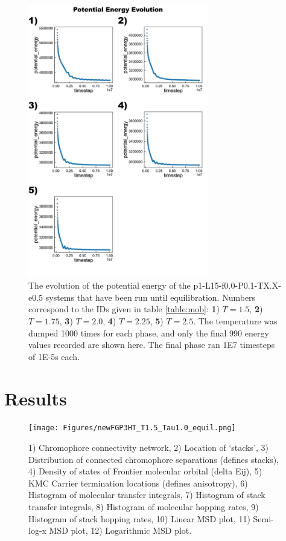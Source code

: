 \documentclass[12pt]{article}
\begin{document}
\begin{figure}[h!]\centering
	\includegraphics[width=0.7\textwidth]{Figures/Potential_Energy_Evolution.png}
    \caption{The evolution of the potential energy of the p1-L15-f0.0-P0.1-TX.X-e0.5 systems that have been run until equilibration.
        Numbers correspond to the IDs given in table \ref{table:mob}: \textbf{1}) $T = 1.5$, \textbf{2}) $T = 1.75$, \textbf{3}) $T = 2.0$, \textbf{4}) $T = 2.25$, \textbf{5}) $T = 2.5$.
    The temperature was dumped 1000 times for each phase, and only the final 990 energy values recorded are shown here.
    The final phase ran 1E7 timesteps of 1E-5s each.
}
	\label{fig:PE}
\end{figure}


\clearpage


\section{Results}


\begin{figure}[h]\centering
	\texttt{[image: Figures/newFGP3HT\_T1.5\_Tau1.0\_equil.png]}
    \caption{   1) Chromophore connectivity network, 
                2) Location of `stacks', 
                3) Distribution of connected chromophore separations (defines stacks),
                4) Density of states of Frontier molecular orbital (delta Eij),
                5) KMC Carrier termination locations (defines anisotropy),
                6) Histogram of molecular transfer integrals,
                7) Histogram of stack transfer integrals,
                8) Histogram of molecular hopping rates,
                9) Histogram of stack hopping rates,
                10) Linear MSD plot,
                11) Semi-log-x MSD plot,
                12) Logarithmic MSD plot.}
	\label{fig:T1.5}
\end{figure}
\end{document}

